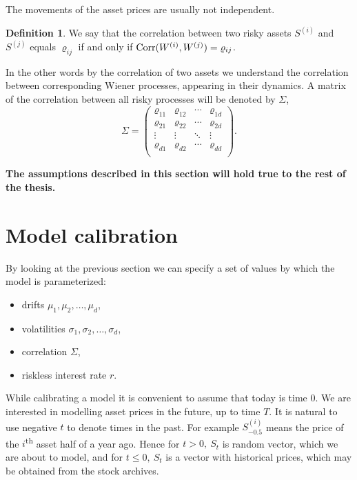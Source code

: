 \documentclass[a4paper,11pt, twoside]{book}
\theoremstyle{definition}
\newtheorem{mydef}{Definition}[chapter]
\theoremstyle{remark}
\newcounter{example}[chapter]
\def\Corr{{\hbox{Corr}}}
\begin{document}
The movements of the asset prices are usually not independent.
\begin{mydef}
 We say that the correlation between two risky assets $S^{(i)}$ and $S^{(j)}$ equals $\varrho_{ij}$ if and only if $\Corr(W^{(i)}, W^{(j)}) = \varrho_{ij}$.
\end{mydef}
In the other words by the correlation of two assets we understand the correlation between corresponding Wiener processes, appearing in their dynamics. A matrix of the correlation between all risky processes will be denoted by $\Sigma$,
\begin{equation*}
 \Sigma = \left( \begin{array}{cccc}
           \varrho_{11} & \varrho_{12} & \cdots & \varrho_{1d} \\
           \varrho_{21} & \varrho_{22} & \cdots & \varrho_{2d} \\
           \vdots & \vdots & \ddots & \vdots \\
           \varrho_{d1} & \varrho_{d2} & \cdots & \varrho_{dd} \\
          \end{array} \right).
\end{equation*}

\textbf{The assumptions described in this section will hold true to the rest of the thesis.}

\section{Model calibration}
By looking at the previous section we can specify a set of values by which the model is parameterized:
\begin{itemize}
 \item drifts $\mu_1, \mu_2, \ldots, \mu_d$,
 \item volatilities $\sigma_1, \sigma_2, \ldots, \sigma_d$,
 \item correlation $\Sigma$,
 \item riskless interest rate $r$.
\end{itemize}
While calibrating a model it is convenient to assume that today is time $0$. We are interested in modelling asset prices in the future, up to time $T$. It is natural to use negative $t$ to denote times in the past. For example $S^{(i)}_{-0.5}$ means the price of the $i$\textsuperscript{th} asset half of a year ago. Hence for $t > 0,\ S_t$ is random vector, which we are about to model, and for $t \leq 0,\ S_t$ is a vector with historical prices, which may be obtained from the stock archives.
\end{document}
